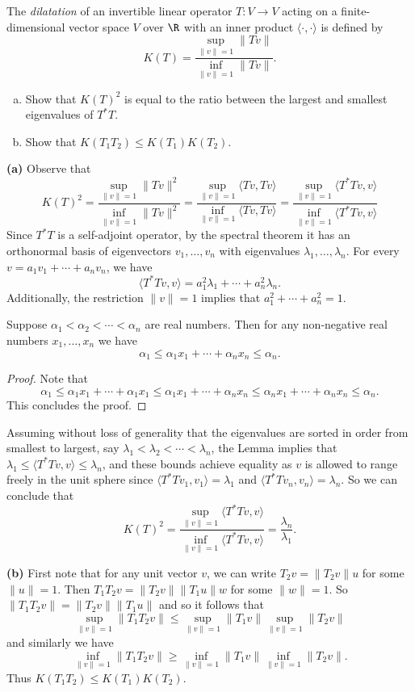 \begin{problem}
The {\em dilatation} of an invertible linear operator $T:V\to V$ acting on a finite-dimensional vector space $V$ over $\R$ with an inner product $\langle \cdot,\cdot\rangle$ is defined by
\[K(T)=\frac{\sup_{\|v\|=1} \|Tv\|}{\inf_{\|v\|=1} \|Tv\|}.\]
\begin{enumerate}[(a)]
  \item Show that $K(T)^2$ is equal to the ratio between the largest and smallest eigenvalues of $T^*T$.
  \item Show that $K(T_1T_2)\leq K(T_1)K(T_2)$.
\end{enumerate}
\end{problem}

\textbf{(a)} Observe that
\[K(T)^2=\frac{\sup_{\|v\|=1} \|Tv\|^2}{\inf_{\|v\|=1} \|Tv\|^2}=\frac{\sup_{\|v\|=1} \langle Tv, Tv\rangle}{\inf_{\|v\|=1} \langle Tv, Tv\rangle}=\frac{\sup_{\|v\|=1} \langle T^*Tv, v\rangle}{\inf_{\|v\|=1} \langle T^*Tv, v\rangle}\]
Since $T^*T$ is a self-adjoint operator, by the spectral theorem it has an orthonormal basis of eigenvectors $v_1,\ldots,v_n$ with eigenvalues $\lambda_1,\ldots,\lambda_n$. For every $v=a_1v_1+\cdots+a_nv_n$, we have 
\[
  \langle T^*Tv, v\rangle = a_1^2\lambda_1+\cdots+a_n^2\lambda_n
.\]
Additionally, the restriction $\|v\|=1$ implies that $a_1^2+\cdots+a_n^2=1$.
\begin{lemma}
  Suppose $\alpha_1<\alpha_2<\cdots<\alpha_n$ are real numbers. Then for any non-negative real numbers $x_1,\ldots, x_n$ we have
  \[
    \alpha_1 \leq \alpha_1x_1+\cdots+\alpha_nx_n \leq \alpha_n
  .\]  
\end{lemma}
\begin{proof}
  Note that 
  \[
    \alpha_1\leq \alpha_1x_1+\cdots+\alpha_1x_1\leq\alpha_1x_1+\cdots+\alpha_nx_n\leq \alpha_nx_1+\cdots+\alpha_nx_n\leq \alpha_n
  .\]
  This concludes the proof.
\end{proof}
Assuming without loss of generality that the eigenvalues are sorted in order from smallest to largest, say $\lambda_1<\lambda_2<\cdots<\lambda_n$, the Lemma implies that $\lambda_1\leq \langle T^*Tv, v\rangle \leq \lambda_n$, and these bounds achieve equality as $v$ is allowed to range freely in the unit sphere since $\langle T^*Tv_1, v_1\rangle = \lambda_1$ and $\langle T^*Tv_n, v_n\rangle = \lambda_n$. So we can conclude that      
\[K(T)^2=\frac{\sup_{\|v\|=1} \langle T^*Tv, v\rangle}{\inf_{\|v\|=1} \langle T^*Tv, v\rangle}=\frac{\lambda_n}{\lambda_1}.\]

\textbf{(b)} First note that for any unit vector $v$, we can write $T_2v=\|T_2v\|u$ for some $\|u\|=1$. Then $T_1T_2v=\|T_2v\|\|T_1u\|w$ for some $\|w\|=1$. So $\|T_1T_2v\|=\|T_2v\|\|T_1u\|$ and so it follows that \[\sup_{\|v\|=1}\|T_1T_2v\|\leq \sup_{\|v\|=1}\|T_1v\|\sup_{\|v\|=1}\|T_2v\|\] and similarly we have \[\inf_{\|v\|=1}\|T_1T_2v\|\geq \inf_{\|v\|=1}\|T_1v\|\inf_{\|v\|=1}\|T_2v\|.\] Thus $K(T_1T_2)\leq K(T_1)K(T_2)$.     